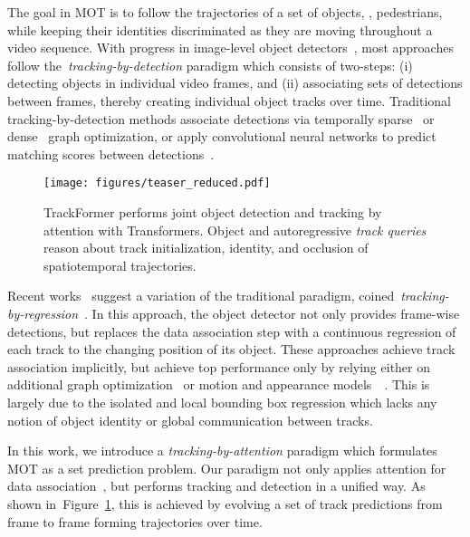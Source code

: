 \documentclass[10pt,twocolumn,letterpaper]{article}
\newcommand{\figref}[1]{Figure~\ref{#1}}
\begin{document}
The goal in MOT is to follow the trajectories of a set of objects, \eg, pedestrians, while keeping their identities discriminated as they are moving throughout a video sequence.
With progress in image-level object detectors~\cite{rennips2015,DETR}, most approaches follow the~\textit{tracking-by-detection} paradigm which consists of two-steps: (i) detecting objects in individual video frames, and (ii) associating sets of detections between frames, thereby creating individual object tracks over time.
Traditional tracking-by-detection methods associate detections via temporally sparse~\cite{MHT_DAM,lealiccv2011} or dense~\cite{jCC, FWT} graph optimization, or apply convolutional neural networks to predict matching scores between detections~\cite{MOTDT,lealcvprw2016}.


\begin{figure}[t]
    \centering
    \texttt{[image: figures/teaser\_reduced.pdf]}
    \caption{
        TrackFormer performs joint object detection and tracking by attention with Transformers.
Object and autoregressive \textit{track queries} reason about track initialization, identity, and occlusion of spatiotemporal trajectories.}
    \label{fig:teaser}
\end{figure} 
Recent works~\cite{tracktor,mot_neural_solver_2020_CVPR,GSM} suggest a variation of the traditional paradigm, coined~\textit{tracking-by-regression}~\cite{MOTCHallenge}.
In this approach, the object detector not only provides frame-wise detections, but replaces the data association step with a continuous regression of each track to the changing position of its object.
These approaches achieve track association implicitly, but achieve top performance only by relying either on additional graph optimization~\cite{mot_neural_solver_2020_CVPR,GSM} or motion and appearance models~~\cite{tracktor}.
This is largely due to the isolated and local bounding box regression which lacks any notion of object identity or global communication between tracks.


In this work, we introduce a \textit{tracking-by-attention} paradigm which formulates MOT as a set prediction problem.
Our paradigm not only applies attention for data association~\cite{tracking_dual_matching, spatial_temporal_attention}, but performs tracking and detection in a unified way.
As shown in~\figref{fig:teaser}, this is achieved by evolving a set of track predictions from frame to frame forming trajectories over time.
\end{document}
